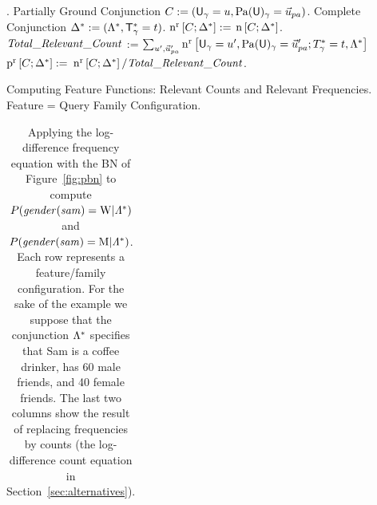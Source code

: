 \documentclass[twoside,11pt]{article}
\begin{document}
\begin{algorithm}[htbp]
{}
\begin{algorithmic}[1]
	\STATE {}.
	\ELSE
	\STATE Partially Ground Conjunction $C := (\Appendterm{\Ground{\UI}  = \UV} {\Ground{\Pa{\UI}} = \Prange{\UT}})$.
	\STATE Complete Conjunction $\Delta^{*}\hspace{0.0ex} := (\Lambda^{*}\hspace{0.0ex},\mathsf{T}_\gamma^{*}\hspace{0.0ex} = t)$.
	\STATE \Return $\mathrm{n}^{\mathrm{r}}\left[C;\Delta^{*}\hspace{0.0ex}\right] :=$ $\mathrm{n}\left[C;\Delta^{*}\hspace{0.0ex}\right]$.
		\ENDIF \\
	\STATE $\it{Total\_Relevant\_Count}$ := $\sum_{\UV',\Prange{\UT}'}\Relcount{\Appendterm{\Ground{\UI}  = \UV'} {\Ground{\Pa{\UI}} = \Prange{\UT}'}} {\Qconj}$
	\STATE \Return $\mathrm{p}^{\mathrm{r}}\left[C;\Delta^{*}\hspace{0.0ex}\right]:=$ $\mathrm{n}^{\mathrm{r}}\left[C;\Delta^{*}\hspace{0.0ex}\right]/\it{Total\_Relevant\_Count}$.
\end{algorithmic}
\caption{Computing Feature Functions: Relevant Counts and Relevant Frequencies. Feature = Query Family Configuration. \label{alg:relcount}}
\end{algorithm}



\begin{table}

\begin{tabular}{lrlrrrr|rr}

\end{tabular}
\caption{Applying the log-difference frequency equation with the BN of Figure~\ref{fig:pbn} to compute $P(\it{gender}(sam) = \mathrm{W} | \Lambda^{*}\hspace{0.0ex})$ and $P(\it{gender}(sam) = \mathrm{M} | \Lambda^{*}\hspace{0.0ex})$. Each row represents a feature/family configuration. For the sake of the example we suppose that the conjunction $\Lambda^{*}\hspace{0.0ex}$ specifies that Sam is a coffee drinker, has 60 male friends, and 40 female friends.
The last two columns show the result of replacing frequencies by counts (the log-difference count equation in Section~\ref{sec:alternatives}).}
\label{table:log-diff-example}
\end{table}
\end{document}
